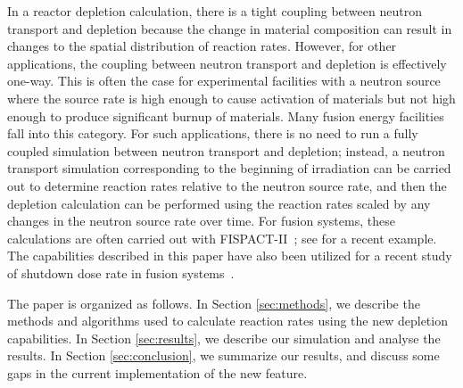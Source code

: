     In a reactor depletion calculation, there is a tight coupling between
    neutron transport and depletion because the change in material composition
    can result in changes to the spatial distribution of reaction rates.
    However, for other applications, the coupling between neutron transport and
    depletion is effectively one-way. This is often the case for experimental
    facilities with a neutron source where the source rate is high enough to
    cause activation of materials but not high enough to produce significant
    burnup of materials. Many fusion energy facilities fall into this category.
    For such applications, there is no need to run a fully coupled simulation
    between neutron transport and depletion; instead, a neutron transport
    simulation corresponding to the beginning of irradiation can be carried out
    to determine reaction rates relative to the neutron source rate, and then
    the depletion calculation can be performed using the reaction rates scaled
    by any changes in the neutron source rate over time. For fusion systems,
    these calculations are often carried out with
    FISPACT-II~\citep{sublet2017nds}; see \citet{eade2020nf} for a recent
    example. The capabilities described in this paper have also been utilized
    for a recent study of shutdown dose rate in fusion
    systems~\citep{peterson2024nf}.

    The paper is organized as follows. In Section \ref{sec:methods}, we describe
    the methods and algorithms used to calculate reaction rates using the new
    depletion capabilities. In Section \ref{sec:results}, we describe our
    simulation and analyse the results. In Section \ref{sec:conclusion}, we
    summarize our results, and discuss some gaps in the current implementation
    of the new feature.


